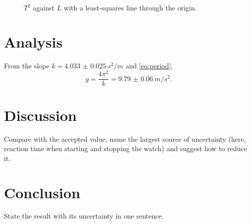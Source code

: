 \documentclass[11pt,a4paper]{article}
\begin{document}
\begin{figure}[htbp]
  \centering
  \caption{$T^2$ against $L$ with a least-squares line through the origin.}
  \label{fig:plot}
\end{figure}

\section{Analysis}
From the slope $k = \qty{4.033(25)}{s^2/m}$ and \cref{eq:period},
\[
  g = \frac{4\pi^2}{k} = \qty{9.79(6)}{m/s^2}.
\]

\section{Discussion}
Compare with the accepted value, name the largest source of uncertainty
(here, reaction time when starting and stopping the watch) and suggest how to
reduce it.

\section{Conclusion}
State the result with its uncertainty in one sentence.

\printbibliography
\end{document}
